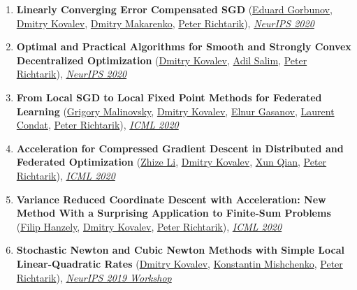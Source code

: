\begin{enumerate}
\item \textbf{Linearly Converging Error Compensated SGD} (\href{https://eduardgorbunov.github.io}{\color{linkcolour}Eduard Gorbunov}, \href{https://www.dmitry-kovalev.com}{\color{linkcolour}Dmitry Kovalev}, \href{}{\color{linkcolour}Dmitry Makarenko}, \href{https://richtarik.org}{\color{linkcolour}Peter Richtarik}), \href{https://papers.nips.cc/paper/2020/hash/ef9280fbc5317f17d480e4d4f61b3751-Abstract.html}{\em \color{black}NeurIPS 2020}
\item \textbf{Optimal and Practical Algorithms for Smooth and Strongly Convex Decentralized Optimization} (\href{https://www.dmitry-kovalev.com}{\color{linkcolour}Dmitry Kovalev}, \href{https://adil-salim.github.io}{\color{linkcolour}Adil Salim}, \href{https://richtarik.org}{\color{linkcolour}Peter Richtarik}), \href{https://papers.nips.cc/paper/2020/hash/d530d454337fb09964237fecb4bea6ce-Abstract.html}{\em \color{black}NeurIPS 2020}
\item \textbf{From Local SGD to Local Fixed Point Methods for Federated Learning} (\href{https://scholar.google.com/citations?user=4w2W9KQAAAAJ}{\color{linkcolour}Grigory Malinovsky}, \href{https://www.dmitry-kovalev.com}{\color{linkcolour}Dmitry Kovalev}, \href{https://elnurgasanov.com}{\color{linkcolour}Elnur Gasanov}, \href{https://lcondat.github.io}{\color{linkcolour}Laurent Condat}, \href{https://richtarik.org}{\color{linkcolour}Peter Richtarik}), \href{http://proceedings.mlr.press/v119/malinovskiy20a.html}{\em \color{black}ICML 2020}
\item \textbf{Acceleration for Compressed Gradient Descent in Distributed and Federated Optimization} (\href{https://zhizeli.github.io}{\color{linkcolour}Zhize Li}, \href{https://www.dmitry-kovalev.com}{\color{linkcolour}Dmitry Kovalev}, \href{https://qianxunk.github.io}{\color{linkcolour}Xun Qian}, \href{https://richtarik.org}{\color{linkcolour}Peter Richtarik}), \href{http://proceedings.mlr.press/v119/li20g.html}{\em \color{black}ICML 2020}
\item \textbf{Variance Reduced Coordinate Descent with Acceleration: New Method With a Surprising Application to Finite-Sum Problems} (\href{https://fhanzely.github.io/index.html}{\color{linkcolour}Filip Hanzely}, \href{https://www.dmitry-kovalev.com}{\color{linkcolour}Dmitry Kovalev}, \href{https://richtarik.org}{\color{linkcolour}Peter Richtarik}), \href{http://proceedings.mlr.press/v119/hanzely20b.html}{\em \color{black}ICML 2020}
\item \textbf{Stochastic Newton and Cubic Newton Methods with Simple Local Linear-Quadratic Rates} (\href{https://www.dmitry-kovalev.com}{\color{linkcolour}Dmitry Kovalev}, \href{https://konstmish.github.io}{\color{linkcolour}Konstantin Mishchenko}, \href{https://richtarik.org}{\color{linkcolour}Peter Richtarik}), \href{https://sites.google.com/site/optneurips19/}{\em \color{black}NeurIPS 2019 Workshop}

\end{enumerate}
